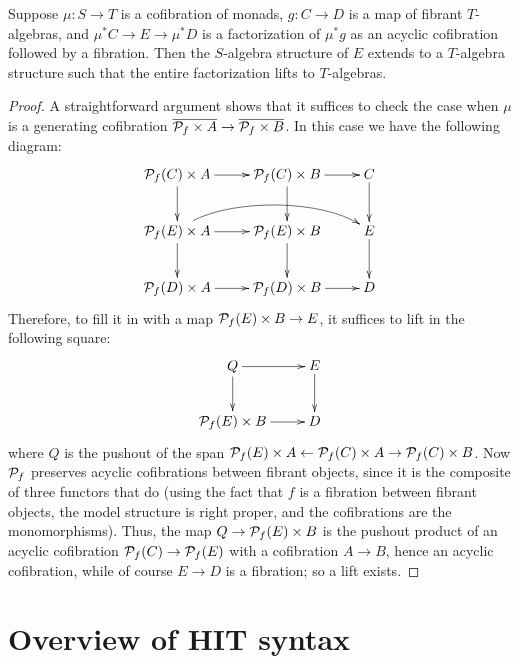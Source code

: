 \documentclass{amsart}
\begin{document}
\begin{lem}\label{thm:moncof-plfib}
  Suppose $\mu:S\to T$ is a cofibration of monads, $g:C\to D$ is a map of fibrant $T$-algebras, and $\mu^*C \to E \to \mu^*D$ is a factorization of $\mu^*g$ as an acyclic cofibration followed by a fibration.
  Then the $S$-algebra structure of $E$ extends to a $T$-algebra structure such that the entire factorization lifts to $T$-algebras.
\end{lem}
\begin{proof}
  A straightforward argument shows that it suffices to check the case when $\mu$ is a generating cofibration $\overline{ \mathcal{P}_{f} \times A} \to \overline{\mathcal{P}_{f} \times B}$.
  In this case we have the following diagram:
  \begin{equation}
  \vcenter{\xymatrix{
      \poly f(C) \times A\ar[r]\ar[d] &
      \poly f(C) \times B\ar[r]\ar[d] &
      C\ar[d]\\
      \poly f(E) \times A\ar[r]\ar[d] \ar@(ur,ul)[rr] &
      \poly f(E) \times B \ar[d] &
      E\ar[d]\\
      \poly f(D) \times A\ar[r] &
      \poly f(D) \times B\ar[r] &
      D
      }}
\end{equation}
Therefore, to fill it in with a map $\mathcal{P}_{f}(E)\times B\to E$, it suffices to lift in the following square:
\begin{equation}
  \vcenter{\xymatrix{
      Q\ar[r]\ar[d] &
      E\ar[d]\\
      \poly f(E) \times B \ar[r] &
      D
      }}
\end{equation}
where $Q$ is the pushout of the span $\mathcal{P}_{f}(E)\times A \leftarrow \mathcal{P}_{f}(C)\times A \to \mathcal{P}_{f}(C) \times B$.
Now $\mathcal{P}_{f}$ preserves acyclic cofibrations between fibrant objects, since it is the composite of three functors that do (using the fact that $f$ is a fibration between fibrant objects, the model structure is right proper, and the cofibrations are the monomorphisms).
Thus, the map $Q \to \mathcal{P}_{f}(E) \times B$ is the pushout product of an acyclic cofibration $\mathcal{P}_{f}(C) \to \mathcal{P}_{f}(E)$ with a cofibration $A\to B$, hence an acyclic cofibration, while of course $E\to D$ is a fibration; so a lift exists.
\end{proof}



\section{Overview of HIT syntax}
\label{sec:syntax}
\end{document}
